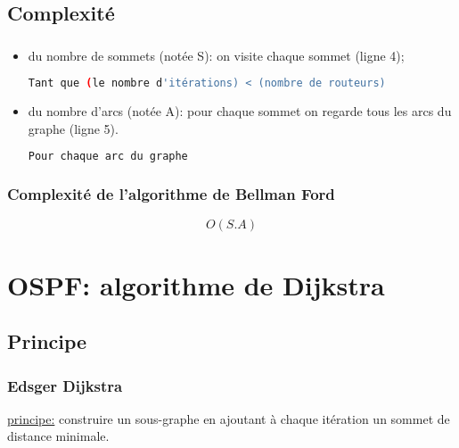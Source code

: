 \documentclass[svgnames,11pt]{beamer}
\begin{document}
\subsection{Complexité}
\begin{frame}[fragile]
    \frametitle{}

    \begin{itemize}
        \item<1-> du nombre de sommets (notée S): on visite chaque sommet (ligne 4);
        \begin{lstlisting}[language=bash]
        Tant que (le nombre d'itérations) < (nombre de routeurs)
        \end{lstlisting}
        \item<2-> du nombre d'arcs (notée A): pour chaque sommet on regarde tous les arcs du graphe (ligne 5).
        \begin{lstlisting}[language=bash]
            Pour chaque arc du graphe
        \end{lstlisting}
    \end{itemize}

\end{frame}
\begin{frame}
    \frametitle{Complexité de l'algorithme de Bellman Ford}

    {\LARGE$$O(S.A)$$}

\end{frame}

\section{OSPF: algorithme de Dijkstra}
\subsection{Principe}
\begin{frame}
    \frametitle{Edsger Dijkstra}

    \underline{principe:} construire un sous-graphe en ajoutant à chaque itération un sommet de distance minimale.

\end{frame}
\end{document}

